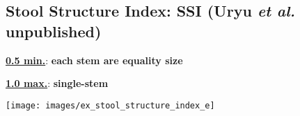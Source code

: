 \documentclass[a0, 25, plainboxedsections]{sciposter} %
\begin{document}
\begin{multicols}{2}
\vspace{-1.8em}\begin{figure}
 \begin{minipage}{0.6\hsize}
 \subsection*{Stool Structure Index: SSI \tiny(Uryu \textit{et al.} unpublished)}

\textbf{\underline{0.5 min.}}: \textbf{each stem are equality size}

\textbf{\underline{1.0 max.}}: \textbf{single-stem}
 \end{minipage}
 \begin{minipage}{0.4\hsize}
  \centering
   \texttt{[image: images/ex\_stool\_structure\_index\_e]}  
 \end{minipage}
\end{figure}

\end{multicols}
\begin{mdframed}[style=section.frame]
  \LARGE\textbf{\color{white}{RESULTS}}
\end{mdframed}\vspace{-1.2em}
\end{document}
